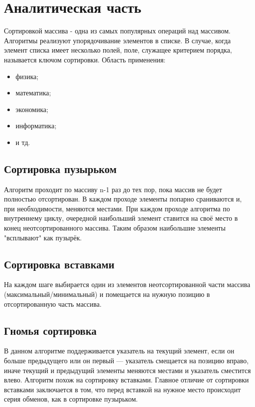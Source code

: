 \documentclass[a4paper, 12pt]{article}
\begin{document}
\section{Аналитическая часть}
\begin{flushleft}
	\hspace*{5mm} Сортировкой массива - одна из самых популярных операций над массивом.\cite{sortIntro} Алгоритмы реализуют упорядочивание элементов в списке. В случае, когда элемент списка имеет несколько полей, поле, служащее критерием порядка, называется ключом сортировки.
	\newline Область применения:
	\begin{itemize}
		\item физика;
		\item математика;
		\item экономика;
		\item информатика;
		\item и тд. 
	\end{itemize}
	\subsection{Сортировка пузырьком}
	\hspace*{5mm} Алгоритм проходит по массиву n-1 раз до тех пор, пока массив не будет полностью отсортирован. В каждом проходе элементы попарно сраниваются и, при необходимости, меняются местами. При каждом проходе алгоритма по внутреннему циклу, очередной наибольший элемент ставится на своё место в конец неотсортированного массива. Таким образом наибольшие элементы "всплывают" как пузырёк.
	
	\subsection{Сортировка вставками}
	\hspace*{5mm} На каждом шаге выбирается один из элементов неотсортированной части массива (максимальный/минимальный) и помещается на нужную позицию в отсортированную часть массива.
	
	\subsection{Гномья сортировка}
	\hspace*{5mm} В данном алгоритме поддерживается указатель на текущий элемент, если он больше предыдущего или он первый — указатель смещается на позицию вправо, иначе текущий и предыдущий элементы меняются местами и  указатель сместится влево. Алгоритм похож на сортировку вставками. Главное отличие от сортировки вставками заключается в том, что перед вставкой на нужное место происходит серия обменов, как в сортировке пузырьком.
\end{flushleft}
\end{document}

